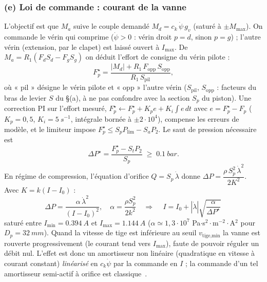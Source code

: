 \documentclass[11pt,a4paper]{article}
\newcommand{\dt}[1]{\dot{#1}}
\begin{document}
\subsubsection*{(e) Loi de commande : courant de la vanne}
L'objectif est que $M_a$ suive le couple demandé $M_d=c_k\,\dt\psi\,g_v$ (saturé à $\pm M_{\max}$). On commande le vérin qui comprime ($\dt\psi>0$ : vérin droit $p=d$, sinon $p=g$) ; l'autre vérin (extension, par le clapet) est laissé ouvert à $I_{\max}$. De $M_a=R_1(F_dS_d-F_gS_g)$ on déduit l'effort de consigne du vérin pilote :
\begin{equation}
 F_p^\star=\frac{|M_d|+R_1\,F_{\text{opp}}\,S_{\text{opp}}}{R_1\,S_{\text{pil}}},
\end{equation}
où « pil » désigne le vérin pilote et « opp » l'autre vérin ($S_{\text{pil}}$, $S_{\text{opp}}$ : facteurs du bras de levier $S$ du §(a), à ne pas confondre avec la section $S_p$ du piston). Une correction PI sur l'effort mesuré, $F_p^\star\leftarrow F_p^\star+K_pe+K_i\!\int e\,dt$ avec $e=F_p^\star-F_p$ ($K_p=0{,}5$, $K_i=\SI{5}{s^{-1}}$, intégrale bornée à $\pm2\cdot10^4$), compense les erreurs de modèle, et le limiteur impose $F_p^\star\le S_pP_{\lim}-S_aP_2$. Le saut de pression nécessaire est
\begin{equation}
 \Delta P^\star=\frac{F_p^\star-S_tP_2}{S_p}\;\ge\;\SI{0,1}{bar}.
\end{equation}
En régime de compression, l'équation d'orifice $Q=S_p\,\dt\lambda$ donne $\Delta P=\dfrac{\rho\,S_p^2\,\dt\lambda^2}{2K^2}$. Avec $K=k(I-I_0)$ :
\begin{equation}
 \Delta P=\frac{\alpha\,\dt\lambda^2}{(I-I_0)^2},\quad\alpha=\frac{\rho S_p^2}{2k^2}\quad\Longrightarrow\quad
 \boxed{\,I=I_0+|\dt\lambda|\sqrt{\frac{\alpha}{\Delta P^\star}}\,}
\end{equation}
saturé entre $I_{\min}=\SI{0,394}{A}$ et $I_{\max}=\SI{1,144}{A}$ ($\alpha\simeq1{,}3\cdot10^{7}$ Pa$\cdot$s$^2\cdot$m$^{-2}\cdot$A$^2$ pour $D_p=\SI{32}{mm}$). Quand la vitesse de tige est inférieure au seuil $v_{\text{tige,min}}$ la vanne est rouverte progressivement (le courant tend vers $I_{\max}$), faute de pouvoir réguler un débit nul. L'effet est donc un amortisseur non linéaire (quadratique en vitesse à courant constant) \emph{linéarisé} en $c_k\dt\psi$ par la commande en $I$ ; la commande d'un tel amortisseur semi-actif à orifice est classique~\cite{Merritt1967}.
\end{document}
